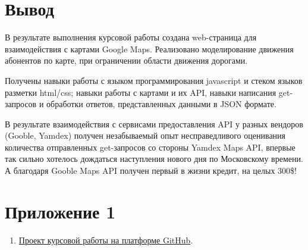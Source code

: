 \documentclass[a4paper]{article}
\begin{document}
\begin{onehalfspacing}
\section{Вывод}

\tab В результате выполнения курсовой работы создана web-страница для взаимодействия с картами Google Maps. Реализовано моделирование движения абонентов по карте, при ограничении области движения дорогами.

Получены навыки работы с языком программирования javascript и стеком языков разметки html/css; навыки работы с картами и их API, навыки написания get-запросов и обработки ответов, представленных данными в JSON формате. 

В результате взаимодействия с сервисами предоставления API у разных вендоров (Gooble, Yamdex) получен незабываемый опыт несправедливого оценивания количества отправленных get-запросов со стороны Yamdex Maps API, впервые так сильно хотелось дождаться наступления нового дня по Московскому времени. А благодаря Gooble Maps API получен первый в жизни кредит, на целых 300\$!

\section*{Приложение 1}

\begin{enumerate}

	\item \href {https://github.com/SLADKAY-KISA/JS_MRS.git}{Проект курсовой работы на платформе GitHub}.
	
\end{enumerate}
\end{onehalfspacing}

\clearpage
\end{document}

